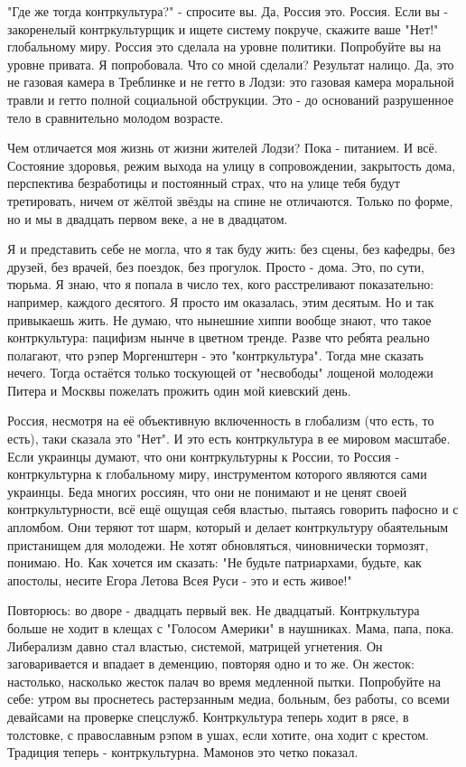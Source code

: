 "Где же тогда контркультура?" - спросите вы. Да, Россия это. Россия. Если вы -
закоренелый контркультурщик и ищете систему покруче, скажите ваше "Нет!"
глобальному миру. Россия это сделала на уровне политики. Попробуйте вы на
уровне привата. Я попробовала. Что со мной сделали? Результат налицо. Да, это
не газовая камера в Треблинке и не гетто в Лодзи: это газовая камера моральной
травли и гетто полной социальной обструкции. Это - до оснований разрушенное
тело в сравнительно молодом возрасте.

Чем отличается моя жизнь от жизни жителей Лодзи? Пока - питанием. И всё.
Состояние здоровья, режим выхода на улицу в сопровождении, закрытость дома,
перспектива безработицы и постоянный страх, что на улице тебя будут
третировать, ничем от жёлтой звёзды на спине не отличаются. Только по форме, но
и мы в двадцать первом веке, а не в двадцатом. 

Я и представить себе не могла, что я так буду жить: без сцены, без кафедры, без
друзей, без врачей, без поездок, без прогулок. Просто - дома. Это, по сути,
тюрьма. Я знаю, что я попала в число тех, кого расстреливают показательно:
например, каждого десятого. Я просто им оказалась, этим десятым. Но и так
привыкаешь жить. Не думаю, что нынешние хиппи вообще знают, что такое
контркультура: пацифизм нынче в цветном тренде. Разве что ребята реально
полагают, что рэпер Моргенштерн - это "контркультура". Тогда мне сказать
нечего.  Тогда остаётся только тоскующей от "несвободы" лощеной молодежи Питера
и Москвы пожелать прожить один мой киевский день. 

Россия, несмотря на её объективную включенность в глобализм (что есть, то
есть), таки сказала это "Нет". И это есть контркультура в ее мировом масштабе.
Если украинцы думают, что они контркультурны к России, то Россия -
контркультурна к глобальному миру, инструментом которого являются сами
украинцы. Беда многих россиян, что они не понимают и не ценят своей
контркультурности, всё ещё ощущая себя властью, пытаясь говорить пафосно и с
апломбом. Они теряют тот шарм, который и делает контркультуру обаятельным
пристанищем для молодежи. Не хотят обновляться, чиновнически тормозят, понимаю.
Но. Как хочется им сказать: "Не будьте патриархами, будьте, как апостолы,
несите Егора Летова Всея Руси - это и есть живое!"

Повторюсь: во дворе - двадцать первый век. Не двадцатый. Контркультура больше
не ходит в клещах с "Голосом Америки" в наушниках. Мама, папа, пока. Либерализм
давно стал властью, системой, матрицей угнетения. Он заговаривается и впадает в
деменцию, повторяя одно и то же. Он жесток: настолько, насколько жесток палач
во время медленной пытки. Попробуйте на себе: утром вы проснетесь растерзанным
медиа, больным, без работы, со всеми девайсами на проверке спецслужб.
Контркультура теперь ходит в рясе, в толстовке, с православным рэпом в ушах,
если хотите, она ходит с крестом. Традиция теперь - контркультурна. Мамонов это
четко показал. 

